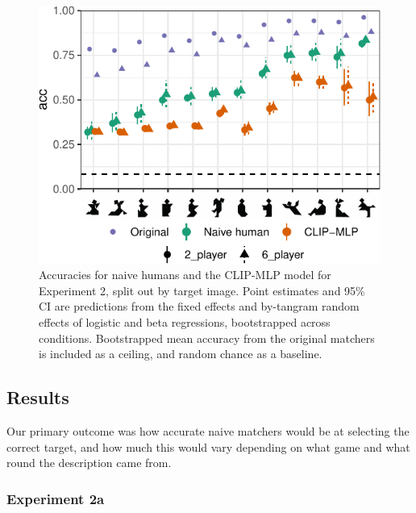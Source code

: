 \documentclass[10pt, letterpaper]{article}
\begin{document}
\begin{CodeChunk}
\begin{figure}[t]

{\centering \includegraphics[width=0.9\linewidth]{figs/fig-2-1} 

}

\caption[Accuracies for naive humans and the CLIP-MLP model for Experiment 2, split out by target image]{Accuracies for naive humans and the CLIP-MLP model for Experiment 2, split out by target image. Point estimates and 95\% CI are predictions from the fixed effects and by-tangram random effects of logistic and beta regressions, bootstrapped across conditions. Bootstrapped mean accuracy from the original matchers is included as a ceiling, and random chance as a baseline. \label{expt2-tangram}}\label{fig:fig-2}
\end{figure}
\end{CodeChunk}

\subsection{Results}\label{results-1}

Our primary outcome was how accurate naive matchers would be at
selecting the correct target, and how much this would vary depending on
what game and what round the description came from.

\subsubsection{Experiment 2a}\label{experiment-2a-1}
\end{document}
